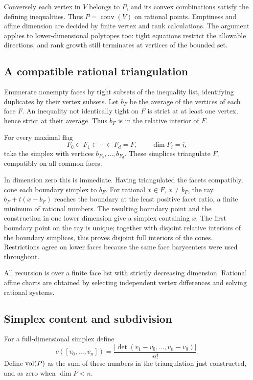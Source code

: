 Conversely each vertex in \(V\) belongs to \(P\),
and its convex combinations satisfy the defining
inequalities. Thus \(P=\operatorname{conv}(V)\)
on rational points. Emptiness and affine dimension
are decided by finite vertex and rank calculations.
The argument applies to lower-dimensional
polytopes too: tight equations restrict the
allowable directions, and rank growth still
terminates at vertices of the bounded set.

\subsection{A compatible rational triangulation}

Enumerate nonempty faces by tight subsets of the
inequality list, identifying duplicates by their
vertex subsets. Let \(b_F\) be the average of the
vertices of each face \(F\).
An inequality not identically tight on \(F\) is
strict at at least one vertex, hence strict at
their average. Thus \(b_F\) is in the relative
interior of \(F\).

For every maximal flag
\[
 F_0\subset F_1\subset\cdots\subset F_d=F,
 \qquad \dim F_i=i,
\]
take the simplex with vertices
\(b_{F_0},\ldots,b_{F_d}\).
These simplices triangulate \(F\), compatibly
on all common faces.

In dimension zero this is immediate. Having
triangulated the facets compatibly, cone each
boundary simplex to \(b_F\).
For rational \(x\in F\), \(x\neq b_F\), the ray
\(b_F+t(x-b_F)\) reaches the boundary at the
least positive facet ratio, a finite minimum of
rational numbers. The resulting boundary point
and the construction in one lower dimension
give a simplex containing \(x\).
The first boundary point on the ray is unique;
together with disjoint relative interiors of
the boundary simplices, this proves disjoint
full interiors of the cones. Restrictions agree
on lower faces because the same face barycenters
were used throughout.

All recursion is over a finite face list with
strictly decreasing dimension. Rational affine
charts are obtained by selecting independent
vertex differences and solving rational systems.

\subsection{Simplex content and subdivision}

For a full-dimensional simplex define
\[
 c([v_0,\ldots,v_n])
   =\frac{|\det(v_1-v_0,\ldots,v_n-v_0)|}{n!}.
\]
Define \(\operatorname{vol}(P)\) as the sum of these numbers in
the triangulation just constructed, and as zero
when \(\dim P<n\).

